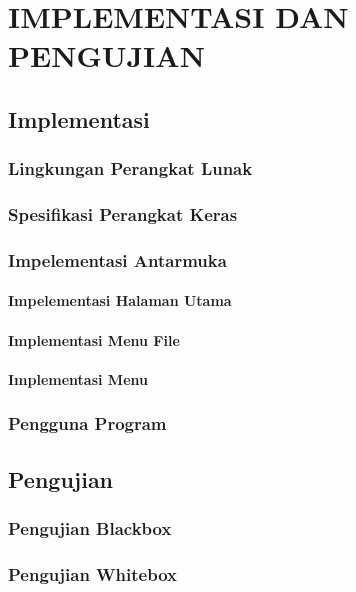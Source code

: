 \chapter{IMPLEMENTASI DAN PENGUJIAN}

%
\vspace{4.5pt}

\section{Implementasi}

\subsection{Lingkungan Perangkat Lunak}

\subsection{Spesifikasi Perangkat Keras}

\subsection{Impelementasi Antarmuka}

\subsubsection{Impelementasi Halaman Utama}

\subsubsection{Implementasi Menu File}

\subsubsection{Implementasi Menu}

\subsection{Pengguna Program}

\section{Pengujian}

\subsection{Pengujian Blackbox}

\subsection{Pengujian Whitebox}

\newpage